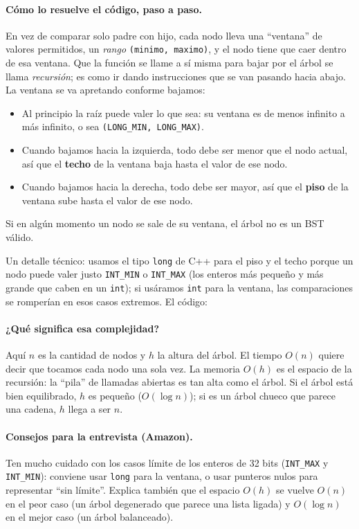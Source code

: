 \paragraph{Cómo lo resuelve el código, paso a paso.} En vez de comparar solo
padre con hijo, cada nodo lleva una ``ventana'' de valores permitidos, un
\emph{rango} \texttt{(minimo, maximo)}, y el nodo tiene que caer dentro de esa
ventana. Que la función se llame a sí misma para bajar por el árbol se llama
\emph{recursión}; es como ir dando instrucciones que se van pasando hacia
abajo. La ventana se va apretando conforme bajamos:
\begin{itemize}
    \item Al principio la raíz puede valer lo que sea: su ventana es de menos infinito a más infinito, o sea \texttt{(LONG\_MIN, LONG\_MAX)}.
    \item Cuando bajamos hacia la izquierda, todo debe ser menor que el nodo actual, así que el \textbf{techo} de la ventana baja hasta el valor de ese nodo.
    \item Cuando bajamos hacia la derecha, todo debe ser mayor, así que el \textbf{piso} de la ventana sube hasta el valor de ese nodo.
\end{itemize}
Si en algún momento un nodo se sale de su ventana, el árbol no es un BST válido.

Un detalle técnico: usamos el tipo \texttt{long} de C++ para el piso y el techo
porque un nodo puede valer justo \texttt{INT\_MIN} o \texttt{INT\_MAX} (los
enteros más pequeño y más grande que caben en un \texttt{int}); si usáramos
\texttt{int} para la ventana, las comparaciones se romperían en esos casos
extremos. El código:




\paragraph{¿Qué significa esa complejidad?} Aquí $n$ es la cantidad de nodos y
$h$ la altura del árbol. El tiempo $O(n)$ quiere decir que tocamos cada nodo una
sola vez. La memoria $O(h)$ es el espacio de la recursión: la ``pila'' de
llamadas abiertas es tan alta como el árbol. Si el árbol está bien equilibrado,
$h$ es pequeño ($O(\log n)$); si es un árbol chueco que parece una cadena, $h$
llega a ser $n$.

\paragraph{Consejos para la entrevista (Amazon).} Ten mucho cuidado con los
casos límite de los enteros de 32 bits (\texttt{INT\_MAX} y \texttt{INT\_MIN}):
conviene usar \texttt{long} para la ventana, o usar punteros nulos para
representar ``sin límite''. Explica también que el espacio $O(h)$ se vuelve
$O(n)$ en el peor caso (un árbol degenerado que parece una lista ligada) y
$O(\log n)$ en el mejor caso (un árbol balanceado).
